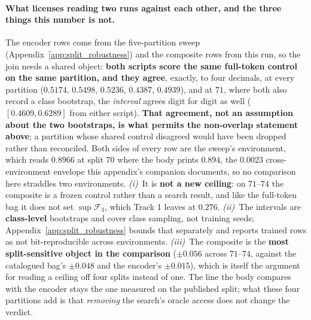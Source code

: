 \paragraph{What licenses reading two runs against each other, and the three things this number is not.} The encoder rows come from the five-partition sweep (Appendix~\ref{app:split_robustness}) and the composite rows from this run, so the join needs a shared object: \textbf{both scripts score the same full-token control on the same partition, and they agree}, exactly, to four decimals, at every partition ($0.5174$, $0.5498$, $0.5236$, $0.4387$, $0.4939$), and at $71$, where both also record a class bootstrap, the \emph{interval} agrees digit for digit as well ($[0.4609,0.6289]$ from either script). \textbf{That agreement, not an assumption about the two bootstraps, is what permits the non-overlap statement above}; a partition whose shared control disagreed would have been dropped rather than reconciled. Both sides of every row are the sweep's environment, which reads $0.8966$ at split $70$ where the body prints $0.894$, the $0.0023$ cross-environment envelope this appendix's companion documents, so no comparison here straddles two environments. \emph{(i)}~It is \textbf{not a new ceiling}: on $71$--$74$ the composite is a frozen control rather than a search result, and like the full-token bag it does not set $\sup\mathcal{F}_3$, which Track 1 leaves at $0.276$. \emph{(ii)}~The intervals are \textbf{class-level} bootstraps and cover class sampling, not training seeds; Appendix~\ref{app:split_robustness} bounds that separately and reports trained rows as not bit-reproducible across environments. \emph{(iii)}~The composite is the \textbf{most split-sensitive object in the comparison} ($\pm0.056$ across $71$--$74$, against the catalogued bag's $\pm0.048$ and the encoder's $\pm0.015$), which is itself the argument for reading a ceiling off four splits instead of one. The line the body compares with the encoder stays the one measured on the published split; what these four partitions add is that \emph{removing} the search's oracle access does not change the verdict.

